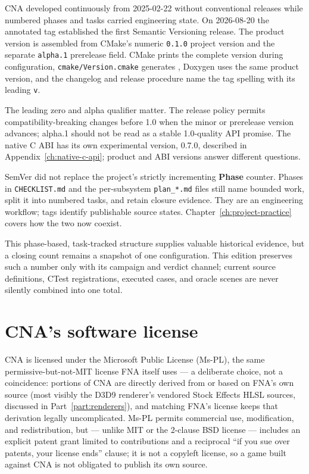 CNA developed continuously from 2025-02-22 without conventional releases while numbered phases
and tasks carried engineering state. On 2026-08-20 the annotated
\CnaEditionTag{} tag established the first Semantic Versioning release. The product version is
assembled from CMake's numeric \texttt{0.1.0} project version and the separate
\texttt{alpha.1} prerelease field. CMake prints the complete version during configuration,
\texttt{cmake/Version.cmake} generates , Doxygen uses the same product
version, and the changelog and release procedure name the tag spelling with its leading
\texttt{v}.

The leading zero and alpha qualifier matter. The release policy permits compatibility-breaking
changes before 1.0 when the minor or prerelease version advances; alpha.1 should not be read as a
stable 1.0-quality API promise. The native C ABI has its own experimental version, 0.7.0, described
in Appendix~\ref{ch:native-c-api}; product and ABI versions answer different questions.

SemVer did not replace the project's strictly incrementing \textbf{Phase} counter. Phases in
\texttt{CHECKLIST.md} and the per-subsystem \texttt{plan\_*.md} files still name bounded work,
split it into numbered tasks, and retain closure evidence. They are an engineering workflow;
tags identify publishable source states. Chapter~\ref{ch:project-practice} covers how the two now
coexist.

This phase-based, task-tracked structure supplies valuable historical evidence, but a closing
count remains a snapshot of one configuration.  This edition preserves such a number only with
its campaign and verdict channel; current source definitions, CTest registrations, executed
cases, and oracle scenes are never silently combined into one total.

\section{CNA's software license}

CNA is licensed under the Microsoft Public License (Ms-PL), the same permissive-but-not-MIT
license FNA itself uses --- a deliberate choice, not a coincidence: portions of CNA are
directly derived from or based on FNA's own source (most visibly the D3D9 renderer's vendored
Stock Effects HLSL sources, discussed in Part~\ref{part:renderers}), and matching FNA's license keeps that
derivation legally uncomplicated. Ms-PL permits commercial use, modification, and
redistribution, but --- unlike MIT or the 2-clause BSD license --- includes an explicit patent
grant limited to contributions and a reciprocal ``if you sue over patents, your license ends''
clause; it is not a copyleft license, so a game built against CNA is not obligated to publish its
own source.

